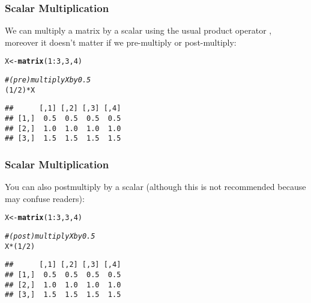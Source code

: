 \documentclass[12pt]{beamer}\usepackage[]{graphicx}\usepackage[]{color}
\makeatletter
\newcommand{\hlnum}[1]{\textcolor[rgb]{0.686,0.059,0.569}{#1}}%
\newcommand{\hlcom}[1]{\textcolor[rgb]{0.678,0.584,0.686}{\textit{#1}}}%
\newcommand{\hlopt}[1]{\textcolor[rgb]{0,0,0}{#1}}%
\newcommand{\hlstd}[1]{\textcolor[rgb]{0.345,0.345,0.345}{#1}}%
\newcommand{\hlkwb}[1]{\textcolor[rgb]{0.69,0.353,0.396}{#1}}%
\newcommand{\hlkwd}[1]{\textcolor[rgb]{0.737,0.353,0.396}{\textbf{#1}}}%
\newenvironment{kframe}{%
 \def\at@end@of@kframe{}%
 \ifinner\ifhmode%
  \def\at@end@of@kframe{\end{minipage}}%
  \begin{minipage}{\columnwidth}%
 \fi\fi%
 \def\FrameCommand##1{\hskip\@totalleftmargin \hskip-\fboxsep
 \colorbox{shadecolor}{##1}\hskip-\fboxsep
     \hskip-\linewidth \hskip-\@totalleftmargin \hskip\columnwidth}%
 \MakeFramed {\advance\hsize-\width
   \@totalleftmargin\z@ \linewidth\hsize
   \@setminipage}}%
 {\par\unskip\endMakeFramed%
 \at@end@of@kframe}
\newenvironment{knitrout}{}{} %
\makeatother
\begin{document}

\begin{frame}[fragile]
\frametitle{Scalar Multiplication}

We can multiply a matrix by a scalar using the usual product operator \code{*}, 
moreover it doesn't matter if we pre-multiply or post-multiply:

\begin{knitrout}\footnotesize
{}\color{fgcolor}\begin{kframe}
\begin{alltt}
\hlstd{X} \hlkwb{<-} \hlkwd{matrix}\hlstd{(}\hlnum{1}\hlopt{:}\hlnum{3}\hlstd{,} \hlnum{3}\hlstd{,} \hlnum{4}\hlstd{)}

\hlcom{# (pre)multiply X by 0.5}
\hlstd{(}\hlnum{1}\hlopt{/}\hlnum{2}\hlstd{)} \hlopt{*} \hlstd{X}
\end{alltt}
\begin{verbatim}
##      [,1] [,2] [,3] [,4]
## [1,]  0.5  0.5  0.5  0.5
## [2,]  1.0  1.0  1.0  1.0
## [3,]  1.5  1.5  1.5  1.5
\end{verbatim}
\end{kframe}
\end{knitrout}

\end{frame}


\begin{frame}[fragile]
\frametitle{Scalar Multiplication}

You can also postmultiply by a scalar (although this is not recommended 
because may confuse readers):

\begin{knitrout}\footnotesize
{}\color{fgcolor}\begin{kframe}
\begin{alltt}
\hlstd{X} \hlkwb{<-} \hlkwd{matrix}\hlstd{(}\hlnum{1}\hlopt{:}\hlnum{3}\hlstd{,} \hlnum{3}\hlstd{,} \hlnum{4}\hlstd{)}

\hlcom{# (post)multiply X by 0.5}
\hlstd{X} \hlopt{*} \hlstd{(}\hlnum{1}\hlopt{/}\hlnum{2}\hlstd{)}
\end{alltt}
\begin{verbatim}
##      [,1] [,2] [,3] [,4]
## [1,]  0.5  0.5  0.5  0.5
## [2,]  1.0  1.0  1.0  1.0
## [3,]  1.5  1.5  1.5  1.5
\end{verbatim}
\end{kframe}
\end{knitrout}

\end{frame}
\end{document}
